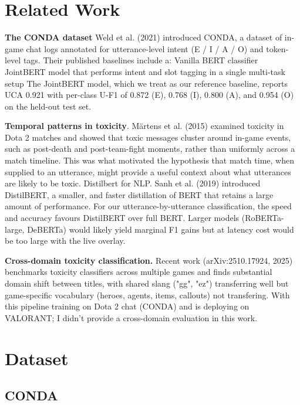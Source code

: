 \documentclass[a4paper,10.5pt,twoside]{article}
\begin{document}
\section{Related Work}

\textbf{The CONDA dataset} Weld et al. (2021) introduced CONDA, a dataset of in-game chat logs annotated for utterance-level intent (E / I / A / O) and token-level tags. Their published baselines include a:
Vanilla BERT classifier 
JointBERT model that performs intent and slot tagging in a single multi-task setup
The JointBERT model, which we treat as our reference baseline, reports UCA 0.921 with per-class U-F1 of 0.872 (E), 0.768 (I), 0.800 (A), and 0.954 (O) on the held-out test set.
\vspace{1em}

\textbf{Temporal patterns in toxicity}. Märtens et al. (2015) examined toxicity in Dota 2 matches and showed that toxic messages cluster around in-game events, such as post-death and post-team-fight moments, rather than uniformly across a match timeline. This was what motivated the hypothesis that match time, when supplied to an utterance, might provide a useful context about what utterances are likely to be toxic.
Distilbert for NLP. Sanh et al. (2019) introduced DistilBERT, a smaller, and faster distillation of BERT that retains a large amount of performance. For our utterance-by-utterance classification, the speed and accuracy favours DistilBERT over full BERT. Larger models (RoBERTa-large, DeBERTa) would likely yield marginal F1 gains but at latency cost would be too large with the live overlay.
\vspace{1em}

\textbf{Cross-domain toxicity classification.} Recent work (arXiv:2510.17924, 2025) benchmarks toxicity classifiers across multiple games and finds substantial domain shift between titles, with shared slang ("gg", "ez") transferring well but game-specific vocabulary (heroes, agents, items, callouts) not transfering. With this pipeline training on Dota 2 chat (CONDA) and is deploying on VALORANT; I didn’t provide a cross-domain evaluation in this work.

\section{Dataset}
\subsection{CONDA}
\end{document}
